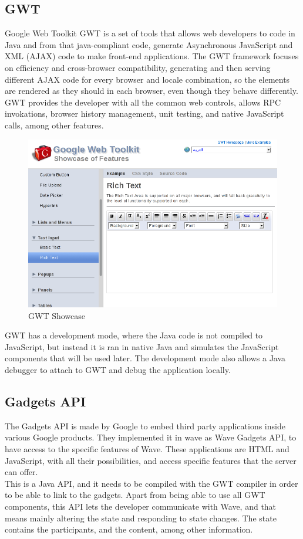 \subsection{GWT}
Google Web Toolkit GWT is a set of tools that allows web developers to code in Java and from that java-compliant code, generate Asynchronous JavaScript and XML (AJAX) code to make front-end applications. The GWT framework focuses on efficiency and cross-browser compatibility, generating and then serving different AJAX code for every browser and locale combination, so the elements are rendered as they should in each browser, even though they behave differently. GWT provides the developer with all the common web controls, allows RPC invokations, browser history management, unit testing, and native JavaScript calls, among other features.\\[.2cm]
\begin{figure}[h]
  \center
    \includegraphics[keepaspectratio, scale=0.4]{Media/Captures/GWT/gwt_showcase.png}
  \caption{GWT Showcase}
  \label{fig:gwt_showcase}
\end{figure}
GWT has a development mode, where the Java code is not compiled to JavaScript, but instead it is ran in native Java and simulates the JavaScript components that will be used later. The development mode also allows a Java debugger to attach to GWT and debug the application locally. 

\subsection{Gadgets API}
The Gadgets API is made by Google to embed third party applications inside various Google products. They implemented it in wave as Wave Gadgets API, to have access to the specific features of Wave. These applications are HTML and JavaScript, with all their possibilities, and access specific features that the server can offer.\\[.3cm]
This is a Java API, and it needs to be compiled with the GWT compiler in order to be able to link to the gadgets. Apart from being able to use all GWT components, this API lets the developer communicate with Wave, and that means mainly altering the state and responding to state changes. The state contains the participants, and the content, among other information. 

